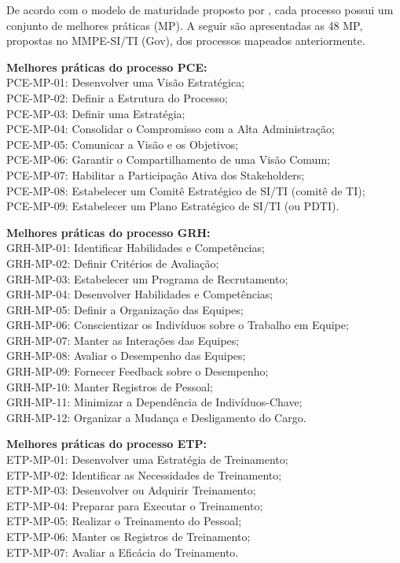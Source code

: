 De acordo com o modelo de maturidade proposto por , cada processo possui um conjunto de melhores práticas (MP). A seguir são apresentadas as 48 MP, propostas no MMPE-SI/TI (Gov), dos processos mapeados anteriormente.

\textbf{Melhores práticas do processo PCE: }
\\PCE-MP-01: Desenvolver uma Visão Estratégica; 
\\PCE-MP-02: Definir a Estrutura do Processo;
\\PCE-MP-03: Definir uma Estratégia;
\\PCE-MP-04: Consolidar o Compromisso com a Alta Administração;
\\PCE-MP-05: Comunicar a Visão e os Objetivos;
\\PCE-MP-06: Garantir o Compartilhamento de uma Visão Comum;
\\PCE-MP-07: Habilitar a Participação Ativa dos Stakeholders;
\\PCE-MP-08: Estabelecer um Comitê Estratégico de SI/TI (comitê de TI);
\\PCE-MP-09: Estabelecer um Plano Estratégico de SI/TI (ou PDTI).

\textbf{Melhores práticas do processo GRH: }
\\GRH-MP-01: Identificar Habilidades e Competências;
\\GRH-MP-02: Definir Critérios de Avaliação;
\\GRH-MP-03: Estabelecer um Programa de Recrutamento;
\\GRH-MP-04: Desenvolver Habilidades e Competências;
\\GRH-MP-05: Definir a Organização das Equipes;
\\GRH-MP-06: Conscientizar os Indivíduos sobre o Trabalho em Equipe;
\\GRH-MP-07: Manter as Interações das Equipes;
\\GRH-MP-08: Avaliar o Desempenho das Equipes;
\\GRH-MP-09: Fornecer Feedback sobre o Desempenho;
\\GRH-MP-10: Manter Registros de Pessoal;
\\GRH-MP-11: Minimizar a Dependência de Indivíduos-Chave;
\\GRH-MP-12: Organizar a Mudança e Desligamento do Cargo.

\textbf{Melhores práticas do processo ETP: }
\\ETP-MP-01: Desenvolver uma Estratégia de Treinamento;
\\ETP-MP-02: Identificar as Necessidades de Treinamento;
\\ETP-MP-03: Desenvolver ou Adquirir Treinamento;
\\ETP-MP-04: Preparar para Executar o Treinamento;
\\ETP-MP-05: Realizar o Treinamento do Pessoal;
\\ETP-MP-06: Manter os Registros de Treinamento;
\\ETP-MP-07: Avaliar a Eficácia do Treinamento.

